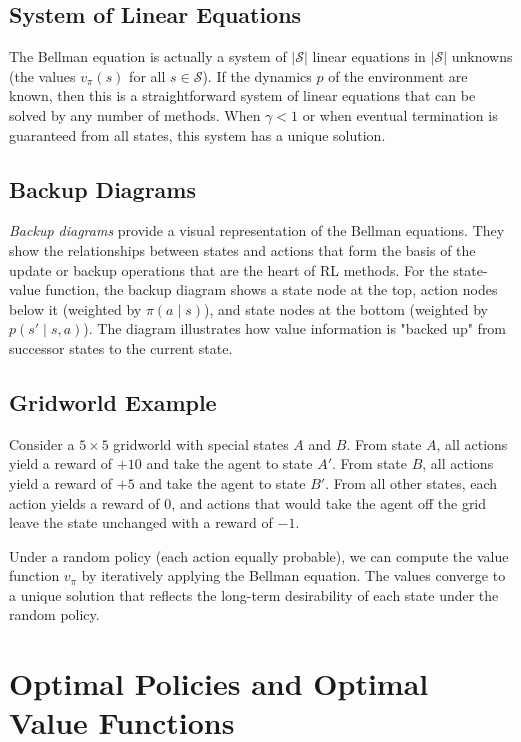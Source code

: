 \documentclass[12pt]{article}
\begin{document}
\subsection{System of Linear Equations}

The Bellman equation is actually a system of $|\mathcal{S}|$ linear equations in $|\mathcal{S}|$ unknowns (the values $v_\pi(s)$ for all $s \in \mathcal{S}$). If the dynamics $p$ of the environment are known, then this is a straightforward system of linear equations that can be solved by any number of methods. When $\gamma < 1$ or when eventual termination is guaranteed from all states, this system has a unique solution.

\subsection{Backup Diagrams}

\textit{Backup diagrams} provide a visual representation of the Bellman equations. They show the relationships between states and actions that form the basis of the update or backup operations that are the heart of RL methods. For the state-value function, the backup diagram shows a state node at the top, action nodes below it (weighted by $\pi(a \mid s)$), and state nodes at the bottom (weighted by $p(s' \mid s, a)$). The diagram illustrates how value information is "backed up" from successor states to the current state.

\subsection{Gridworld Example}

Consider a $5 \times 5$ gridworld with special states $A$ and $B$. From state $A$, all actions yield a reward of $+10$ and take the agent to state $A'$. From state $B$, all actions yield a reward of $+5$ and take the agent to state $B'$. From all other states, each action yields a reward of $0$, and actions that would take the agent off the grid leave the state unchanged with a reward of $-1$.

Under a random policy (each action equally probable), we can compute the value function $v_\pi$ by iteratively applying the Bellman equation. The values converge to a unique solution that reflects the long-term desirability of each state under the random policy.

\section{Optimal Policies and Optimal Value Functions}
\end{document}
